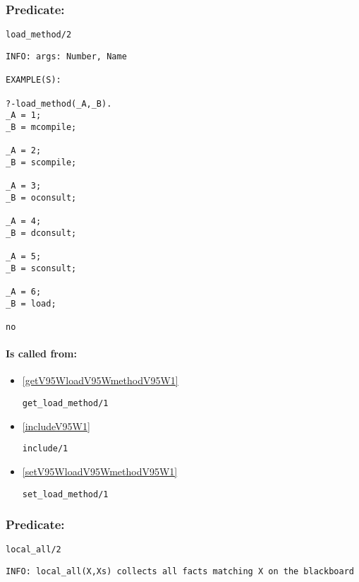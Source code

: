 \subsubsection{Predicate:} \label{loadV95WmethodV95W2}

\begin{verbatim}
load_method/2
\end{verbatim}

{\small \begin{verbatim}
INFO: args: Number, Name

EXAMPLE(S):

?-load_method(_A,_B).
_A = 1;
_B = mcompile;

_A = 2;
_B = scompile;

_A = 3;
_B = oconsult;

_A = 4;
_B = dconsult;

_A = 5;
_B = sconsult;

_A = 6;
_B = load;

no

\end{verbatim}}
\paragraph{Is called from:} 
\begin{itemize}
\item \ref{getV95WloadV95WmethodV95W1} 
\begin{verbatim}
get_load_method/1
\end{verbatim}

\item \ref{includeV95W1} 
\begin{verbatim}
include/1
\end{verbatim}

\item \ref{setV95WloadV95WmethodV95W1} 
\begin{verbatim}
set_load_method/1
\end{verbatim}

\end{itemize}

\subsubsection{Predicate:} \label{localV95WallV95W2}

\begin{verbatim}
local_all/2
\end{verbatim}

{\small \begin{verbatim}
INFO: local_all(X,Xs) collects all facts matching X on the blackboard

\end{verbatim}}
